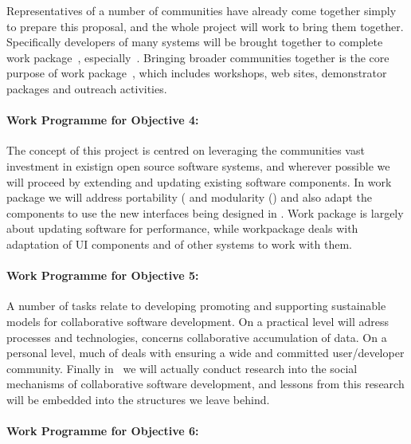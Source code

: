 \documentclass[noworkareas,deliverables,\classoptions]{euproposal}       %
\begin{document}
\begin{proposal}
Representatives of a number of communities have already come together
simply to prepare this proposal, and the whole project will work to
bring them together. Specifically developers of many systems  will be brought together to complete
work package~,
especially~.
Bringing broader communities together is the core purpose of
work package~, which includes workshops, web sites,
demonstrator packages and outreach activities.

\paragraph{Work Programme for Objective 4: }

The concept of this project is centred on leveraging the communities
vast investment in existign open source software systems, and wherever
possible we will proceed by extending and updating existing software components.
In work package  we will address
portability ( and
modularity () and also
adapt the components to use the new interfaces being designed in
. Work package
 is largely about updating software for performance, while
workpackage  deals with adaptation of UI components and of
other systems to work with them.

\paragraph{Work Programme for Objective 5: }

A number of tasks relate to developing promoting and supporting
sustainable models for collaborative software development. On a
practical level  will adress
processes and technologies,  concerns
collaborative accumulation of data. On a personal level, much of
 deals with ensuring a wide and committed user/developer
community. Finally in~
we will actually conduct research into the social mechanisms of
collaborative software development, and lessons from this research
will be embedded into the structures we leave behind.

\paragraph{Work Programme for Objective 6: }


\end{proposal}
\end{document}
